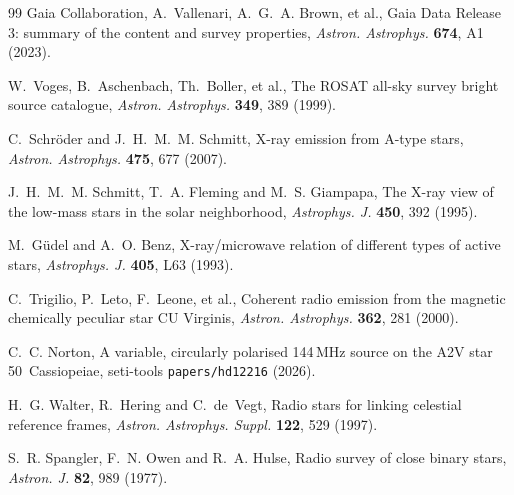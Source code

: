 \documentclass[3p,11pt]{elsarticle}
\begin{document}
\begin{thebibliography}{99}
Gaia Collaboration, A.~Vallenari, A.~G.~A. Brown, et al., Gaia Data Release 3: summary
of the content and survey properties, \emph{Astron. Astrophys.} \textbf{674}, A1 (2023).

W.~Voges, B.~Aschenbach, Th.~Boller, et al., The ROSAT all-sky survey bright source
catalogue, \emph{Astron. Astrophys.} \textbf{349}, 389 (1999).

C.~Schr\"oder and J.~H.~M.~M. Schmitt, X-ray emission from A-type stars, \emph{Astron.
Astrophys.} \textbf{475}, 677 (2007).

J.~H.~M.~M. Schmitt, T.~A. Fleming and M.~S. Giampapa, The X-ray view of the low-mass
stars in the solar neighborhood, \emph{Astrophys. J.} \textbf{450}, 392 (1995).

M.~G\"udel and A.~O. Benz, X-ray/microwave relation of different types of active stars,
\emph{Astrophys. J.} \textbf{405}, L63 (1993).

C.~Trigilio, P.~Leto, F.~Leone, et al., Coherent radio emission from the magnetic
chemically peculiar star CU Virginis, \emph{Astron. Astrophys.} \textbf{362}, 281 (2000).

C.~C. Norton, A variable, circularly polarised 144\,MHz source on the A2V star
50~Cassiopeiae, seti-tools \texttt{papers/hd12216} (2026).

H.~G. Walter, R.~Hering and C.~de~Vegt, Radio stars for linking celestial reference
frames, \emph{Astron. Astrophys. Suppl.} \textbf{122}, 529 (1997).

S.~R. Spangler, F.~N. Owen and R.~A. Hulse, Radio survey of close binary stars,
\emph{Astron. J.} \textbf{82}, 989 (1977).

\end{thebibliography}
\end{document}
